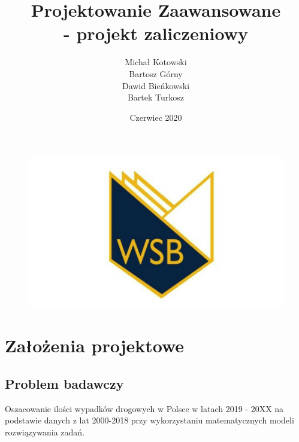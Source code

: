 \documentclass{article}
\begin{document}
\begin{figure}
    \centering
    \includegraphics[scale=0.15]{wsb-s}
\end{figure}
\title{\color{blue}Projektowanie Zaawansowane \\ - projekt zaliczeniowy}
\author{Michał Kotowski \\ Bartosz Górny \\ Dawid Bieńkowski \\ Bartek Turkosz}
\date{Czerwiec 2020}
\maketitle

\section{Założenia projektowe}
\subsection{Problem badawczy}
\qquad Oszacowanie ilości wypadków drogowych w Polsce w latach 2019 - 20XX na podstawie danych z lat 2000-2018 przy wykorzystaniu matematycznych modeli rozwiązywania zadań.
\end{document}
